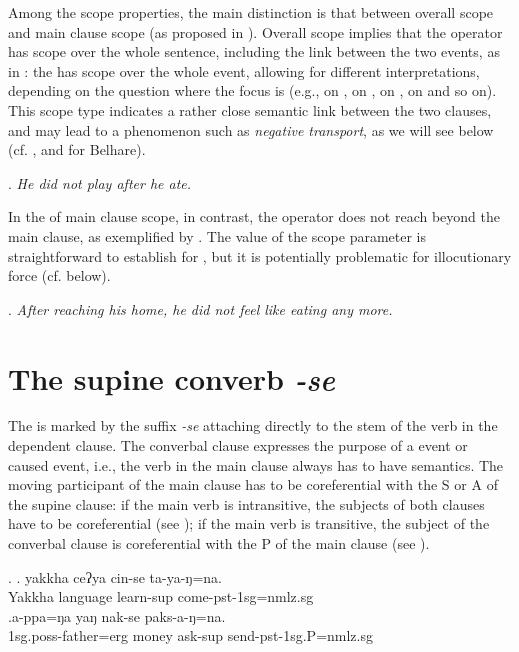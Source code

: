 Among the scope properties, the main distinction is that between overall scope and main clause scope (as proposed in \citealt{Bierkandtetal_Scope}). Overall scope implies that the operator has scope over the whole sentence, including the link between the two events, as in \Next: the  has scope over the whole event, allowing for different interpretations, depending on the question where the focus is (e.g., on , on , on , on  and so on). This scope type indicates a rather close semantic link between the two clauses, and may lead to a phenomenon such as \emph{negative transport},  as we will see below (cf. \citealt[Ch. 5]{Horn1989A-natural}, and \citealt{Bickel1993Belhare} for Belhare). 

\ex. \emph{He did not play after he ate.}

In the  of main clause scope, in contrast, the operator does not reach beyond the main clause, as exemplified by \Next. The value of the scope parameter is straightforward to establish for , but it is potentially problematic for illocutionary force (cf. below).

\ex. \emph{After reaching his home, he did not feel like eating any more.}

\section{The supine converb \emph{-se}}\label{sup}
\largerpage
The  is marked by the suffix \emph{-se} attaching directly to the stem of the verb in the dependent clause.  The converbal clause expresses the purpose of a  event or caused  event, i.e., the verb in the main clause always has to have  semantics. The moving participant of the main clause has to be coreferential with the S or A of the supine clause: if the main verb is intransitive, the subjects of both clauses have to be coreferential (see \Next[a]); if the main verb is transitive, the subject of the converbal clause is coreferential with the P of the main clause (see \Next[b]). 
		
\ex. \ag.	yakkha ceʔya cin-se ta-ya-ŋ=na.\\
			Yakkha language learn{\sc -sup} come-{\sc pst-1sg=nmlz.sg}\\
	\bg.\label{se-appa}a-ppa=ŋa  yaŋ  nak-se  paks-a-ŋ=na.\\
		{\sc 1sg.poss-}father{\sc =erg} money ask{\sc -sup}  send-{\sc pst-1sg.P=nmlz.sg}\\
		
